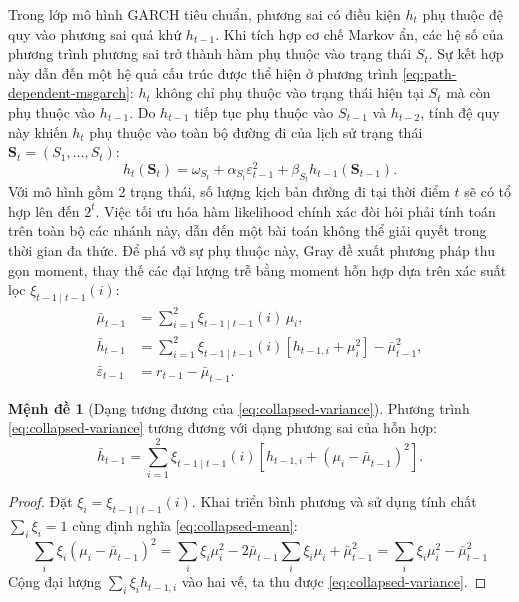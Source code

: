 \documentclass[12pt,a4paper]{article}
\numberwithin{equation}{section}
\theoremstyle{definition}
\newtheorem{proposition}{Mệnh đề}[section]
\begin{document}
Trong lớp mô hình GARCH tiêu chuẩn, phương sai có điều kiện $h_t$ phụ thuộc đệ quy vào phương sai quá khứ $h_{t-1}$. Khi tích hợp cơ chế Markov ẩn, các hệ số của phương trình phương sai trở thành hàm phụ thuộc vào trạng thái $S_t$. Sự kết hợp này dẫn đến một hệ quả cấu trúc được thể hiện ở phương trình \eqref{eq:path-dependent-msgarch}: $h_t$ không chỉ phụ thuộc vào trạng thái hiện tại $S_t$ mà còn phụ thuộc vào $h_{t-1}$. Do $h_{t-1}$ tiếp tục phụ thuộc vào $S_{t-1}$ và $h_{t-2}$, tính đệ quy này khiến $h_t$ phụ thuộc vào toàn bộ đường đi của lịch sử trạng thái $\symbf{S}_t = (S_1, \dots, S_t)$:
\begin{equation}
	h_t(\symbf S_t)=\omega_{S_t}+\alpha_{S_t}\varepsilon_{t-1}^{2}
	+\beta_{S_t}h_{t-1}(\symbf S_{t-1}).
	\label{eq:path-dependent-msgarch}
\end{equation}
Với mô hình gồm 2 trạng thái, số lượng kịch bản đường đi tại thời điểm $t$ sẽ có tổ hợp lên đến $2^t$. Việc tối ưu hóa hàm likelihood chính xác đòi hỏi phải tính toán trên toàn bộ các nhánh này, dẫn đến một bài toán không thể giải quyết trong thời gian đa thức. Để phá vỡ sự phụ thuộc này, Gray \cite{gray1996} đề xuất phương pháp thu gọn moment, thay thế các đại lượng trễ bằng moment hỗn hợp dựa trên xác suất lọc $\xi_{t-1\mid t-1}(i)$:
\begin{align}
	\bar\mu_{t-1} &= \sum_{i=1}^{2}\xi_{t-1\mid t-1}(i)\,\mu_i,
	\label{eq:collapsed-mean}\\
	\bar h_{t-1} &= \sum_{i=1}^{2}\xi_{t-1\mid t-1}(i)
	\left[h_{t-1,i}+\mu_i^{2}\right]-\bar\mu_{t-1}^{2},
	\label{eq:collapsed-variance}\\
	\bar\varepsilon_{t-1} &= r_{t-1}-\bar\mu_{t-1}.
	\label{eq:collapsed-residual}
\end{align}

\begin{proposition}[Dạng tương đương của \eqref{eq:collapsed-variance}]\label{prop:gray}
	Phương trình \eqref{eq:collapsed-variance} tương đương với dạng phương sai của hỗn hợp:
	\begin{equation}
		\bar h_{t-1}=\sum_{i=1}^{2}\xi_{t-1\mid t-1}(i)
		\left[h_{t-1,i}+\left(\mu_i-\bar\mu_{t-1}\right)^{2}\right].
		\label{eq:collapsed-variance-alt}
	\end{equation}
\end{proposition}
\begin{proof}
	Đặt $\xi_i=\xi_{t-1\mid t-1}(i)$. Khai triển bình phương và sử dụng tính chất $\sum_i\xi_i=1$ cùng định nghĩa \eqref{eq:collapsed-mean}:
	$$\sum_i\xi_i(\mu_i-\bar\mu_{t-1})^{2}
	=\sum_i\xi_i\mu_i^{2}-2\bar\mu_{t-1}\sum_i\xi_i\mu_i+\bar\mu_{t-1}^{2}
	=\sum_i\xi_i\mu_i^{2}-\bar\mu_{t-1}^{2}$$
	Cộng đại lượng $\sum_i\xi_i h_{t-1,i}$ vào hai vế, ta thu được \eqref{eq:collapsed-variance}.
\end{proof}
\end{document}
